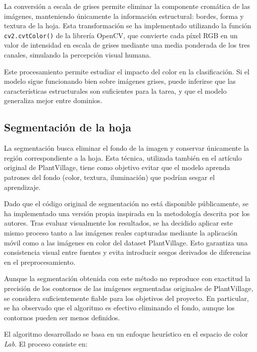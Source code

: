 \documentclass[12pt,a4paper]{article}
\begin{document}
La conversión a escala de grises permite eliminar la componente cromática de las imágenes, manteniendo únicamente la información estructural: bordes, forma y textura de la hoja. Esta transformación se ha implementado utilizando la función \texttt{cv2.cvtColor()} de la librería OpenCV, que convierte cada píxel RGB en un valor de intensidad en escala de grises mediante una media ponderada de los tres canales, simulando la percepción visual humana.

Este procesamiento permite estudiar el impacto del color en la clasificación. Si el modelo sigue funcionando bien sobre imágenes grises, puede inferirse que las características estructurales son suficientes para la tarea, y que el modelo generaliza mejor entre dominios.

\subsection{Segmentación de la hoja}

La segmentación busca eliminar el fondo de la imagen y conservar únicamente la región correspondiente a la hoja. Esta técnica, utilizada también en el artículo original de PlantVillage, tiene como objetivo evitar que el modelo aprenda patrones del fondo (color, textura, iluminación) que podrían sesgar el aprendizaje. 

Dado que el código original de segmentación no está disponible públicamente, se ha implementado una versión propia inspirada en la metodología descrita por los autores. Tras evaluar visualmente los resultados, se ha decidido aplicar este mismo proceso tanto a las imágenes reales capturadas mediante la aplicación móvil como a las imágenes en color del dataset PlantVillage. Esto garantiza una consistencia visual entre fuentes y evita introducir sesgos derivados de diferencias en el preprocesamiento.

Aunque la segmentación obtenida con este método no reproduce con exactitud la precisión de los contornos de las imágenes segmentadas originales de PlantVillage, se considera suficientemente fiable para los objetivos del proyecto. En particular, se ha observado que el algoritmo es efectivo eliminando el fondo, aunque los contornos pueden ser menos definidos.

El algoritmo desarrollado se basa en un enfoque heurístico en el espacio de color \textit{Lab}. El proceso consiste en:
\end{document}
